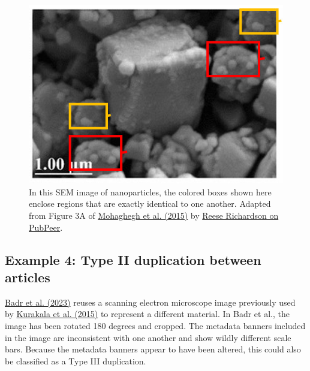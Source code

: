 \documentclass[letterpaper, 12pt]{article}
\begin{document}
\begin{figure}[h!tbp]
    \centering
    \includegraphics[width=\textwidth]{img/image_duplication/image-1741643734642.jpg}
    \caption*{In this SEM image of nanoparticles, the colored boxes shown here enclose regions that are exactly identical to one another. Adapted from Figure 3A of \href{https://doi.org/10.1007/s10853-015-9003-3}{Mohaghegh et al. (2015)} by \href{https://pubpeer.com/publications/7BE7C2A93C385F700F1C6B5BC90294\#1}{Reese Richardson on PubPeer}.}
\end{figure}

\pagebreak

\subsection*{Example 4: Type II duplication between articles}

\href{https://doi.org/10.3390/ph16070925}{Badr et al. (2023)} reuses a scanning electron microscope image previously used by \href{https://doi.org/10.2147/ijn.s77731}{Kurakala et al. (2015)} to represent a different material. In Badr et al., the image has been rotated 180 degrees and cropped. The metadata banners included in the image are inconsistent with one another and show wildly different scale bars. Because the metadata banners appear to have been altered, this could also be classified as a Type III duplication.
\end{document}
